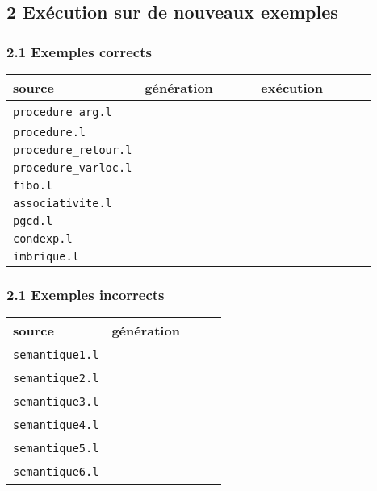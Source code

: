\documentclass[12pt,a4paper]{article}
\begin{document}
\subsection*{2 Exécution sur de nouveaux exemples}

\subsubsection*{2.1 Exemples corrects}

\begin{tabular}{|p{3.7cm}|l|l|} \hline
source       &génération & exécution \\ \hline
{\tt procedure\_arg.l} &~~~~~~~~~~~~~~~~ &~~~~~~~~~~~~~~~~        \\ \hline
{\tt procedure.l} &            &         \\ \hline
{\tt procedure\_retour.l}       &      &         \\ \hline
{\tt procedure\_varloc.l}       &      &         \\ \hline
{\tt fibo.l} &            &         \\ \hline
{\tt associativite.l} &            &         \\ \hline
{\tt pgcd.l} &      &               \\ \hline
{\tt condexp.l} &      &               \\ \hline
{\tt imbrique.l} &      &               \\ \hline
\end{tabular}


\subsubsection*{2.1 Exemples incorrects}

\begin{tabular}{|p{3.4cm}|l|} \hline
source       & génération \\ \hline
{\tt semantique1.l} &~~~~~~~~~~~~~~~~  \\ \hline
{\tt semantique2.l} &~~~~~~~~~~~~~~~~  \\ \hline
{\tt semantique3.l} &~~~~~~~~~~~~~~~~  \\ \hline
{\tt semantique4.l} &~~~~~~~~~~~~~~~~  \\ \hline
{\tt semantique5.l} &~~~~~~~~~~~~~~~~  \\ \hline
{\tt semantique6.l} &~~~~~~~~~~~~~~~~  \\ \hline
\end{tabular}
\end{document}
